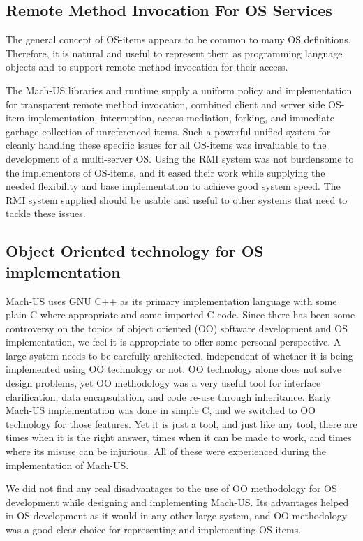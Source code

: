 \subsection{Remote Method Invocation For OS Services}
The general concept of OS-items appears to be common to many OS
definitions. Therefore, it is natural and
useful to represent them as programming language objects and to support
remote method invocation for their access.

The Mach-US libraries and runtime
supply a uniform policy and implementation for
transparent remote method invocation,
combined client and server side OS-item implementation,
interruption, access mediation,
forking, and
immediate garbage-collection of unreferenced items.  
Such a powerful unified system for
cleanly handling these specific
issues for all OS-items was invaluable to the development of a
multi-server OS.  Using the RMI system was not burdensome to the implementors
of OS-items, and it eased their work while supplying the
needed flexibility and base implementation to achieve good system speed.
The RMI system supplied should be usable and useful to other systems that
need to tackle these issues.

\subsection{Object Oriented technology for OS implementation}
Mach-US uses GNU C++ as its primary implementation language with some
plain C where appropriate and some imported C code.  Since there has been
some controversy
on the topics of object oriented (OO) software development
and OS implementation, we feel it is appropriate to offer
some personal perspective.  A large system needs to be carefully
architected, independent of whether it is being implemented using OO
technology or not.  OO technology alone does not solve design problems,
yet OO methodology was a very useful tool for interface
clarification, data encapsulation, and code re-use through inheritance.
Early Mach-US implementation was done in simple C, and we switched to
OO technology for those features.
Yet it is just a tool,
and just like any tool, there are times when it is the right answer, times when
it can be made to work, and times where its misuse can be injurious.
All of these were experienced during the implementation of Mach-US.

We did not find any real disadvantages to the use of OO methodology for OS
development while designing and implementing Mach-US.  Its advantages helped
in OS development as it would in any other large system,
and OO methodology was a good clear choice for representing and implementing
OS-items.

